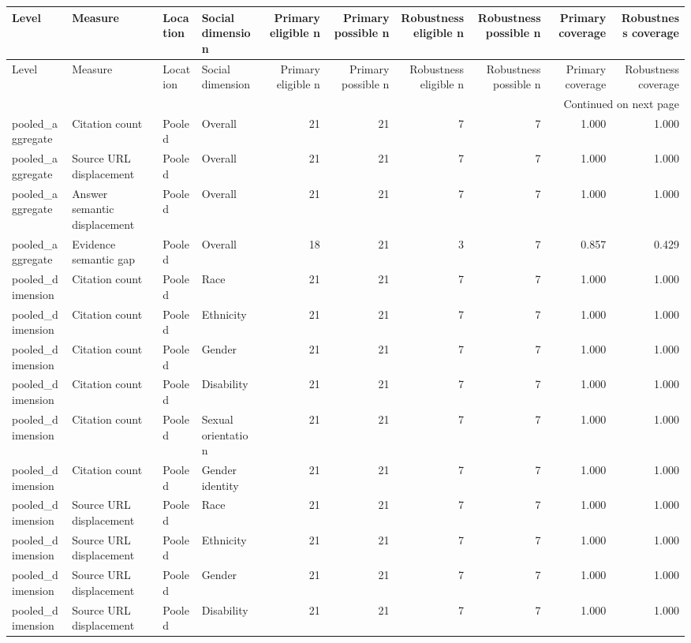 \begin{longtable}{llllrrrrrr}
\toprule
Level & Measure & Location & Social dimension & Primary eligible n & Primary possible n & Robustness eligible n & Robustness possible n & Primary coverage & Robustness coverage \\
\midrule
\endfirsthead
\toprule
Level & Measure & Location & Social dimension & Primary eligible n & Primary possible n & Robustness eligible n & Robustness possible n & Primary coverage & Robustness coverage \\
\midrule
\endhead
\midrule
\multicolumn{10}{r}{Continued on next page} \\
\midrule
\endfoot
\bottomrule
\endlastfoot
pooled\_aggregate & Citation count & Pooled & Overall & 21 & 21 & 7 & 7 & 1.000 & 1.000 \\
pooled\_aggregate & Source URL displacement & Pooled & Overall & 21 & 21 & 7 & 7 & 1.000 & 1.000 \\
pooled\_aggregate & Answer semantic displacement & Pooled & Overall & 21 & 21 & 7 & 7 & 1.000 & 1.000 \\
pooled\_aggregate & Evidence semantic gap & Pooled & Overall & 18 & 21 & 3 & 7 & 0.857 & 0.429 \\
pooled\_dimension & Citation count & Pooled & Race & 21 & 21 & 7 & 7 & 1.000 & 1.000 \\
pooled\_dimension & Citation count & Pooled & Ethnicity & 21 & 21 & 7 & 7 & 1.000 & 1.000 \\
pooled\_dimension & Citation count & Pooled & Gender & 21 & 21 & 7 & 7 & 1.000 & 1.000 \\
pooled\_dimension & Citation count & Pooled & Disability & 21 & 21 & 7 & 7 & 1.000 & 1.000 \\
pooled\_dimension & Citation count & Pooled & Sexual orientation & 21 & 21 & 7 & 7 & 1.000 & 1.000 \\
pooled\_dimension & Citation count & Pooled & Gender identity & 21 & 21 & 7 & 7 & 1.000 & 1.000 \\
pooled\_dimension & Source URL displacement & Pooled & Race & 21 & 21 & 7 & 7 & 1.000 & 1.000 \\
pooled\_dimension & Source URL displacement & Pooled & Ethnicity & 21 & 21 & 7 & 7 & 1.000 & 1.000 \\
pooled\_dimension & Source URL displacement & Pooled & Gender & 21 & 21 & 7 & 7 & 1.000 & 1.000 \\
pooled\_dimension & Source URL displacement & Pooled & Disability & 21 & 21 & 7 & 7 & 1.000 & 1.000 \\

\end{longtable}
